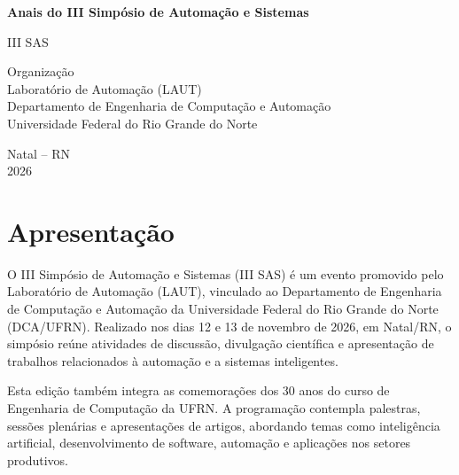 \documentclass[12pt,a4paper,oneside,openany]{book}
\begin{document}
\frontmatter
\thispagestyle{empty}
\begin{center}
  \vspace*{2cm}
  {\Large\bfseries Anais do III Simpósio de Automação e Sistemas\par}
  \vspace{0.5cm}
  {\large III SAS\par}
  \vfill
  {\large Organização\\Laboratório de Automação (LAUT)\\
    Departamento de Engenharia de Computação e Automação\\
    Universidade Federal do Rio Grande do Norte\par}
  \vfill
  {\large Natal -- RN\\2026\par}
\end{center}
\clearpage

\chapter*{Apresentação}

O III Simpósio de Automação e Sistemas (III SAS) é um evento promovido pelo
Laboratório de Automação (LAUT), vinculado ao Departamento de Engenharia de
Computação e Automação da Universidade Federal do Rio Grande do Norte
(DCA/UFRN). Realizado nos dias 12 e 13 de novembro de 2026, em Natal/RN, o
simpósio reúne atividades de discussão, divulgação científica e apresentação
de trabalhos relacionados à automação e a sistemas inteligentes.

Esta edição também integra as comemorações dos 30 anos do curso de Engenharia
de Computação da UFRN. A programação contempla palestras, sessões plenárias e
apresentações de artigos, abordando temas como inteligência artificial,
desenvolvimento de software, automação e aplicações nos setores produtivos.
\end{document}
